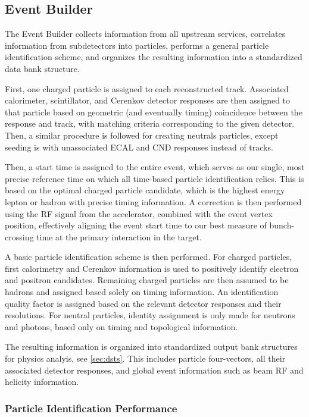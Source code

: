 
\subsection{Event Builder}
The Event Builder collects information from all upstream services, correlates information from subdetectors into particles, performs a general particle identification scheme, and organizes the resulting information into a standardized data bank structure.

First, one charged particle is assigned to each reconstructed track.  Associated calorimeter, scintillator, and C{e}renkov detector responses are then assigned to that particle based on geometric (and eventually timing) coincidence between the response and track, with matching criteria corresponding to the given detector.  Then, a similar procedure is followed for creating neutrals particles, except seeding is with unassociated ECAL and CND responses instead of tracks.

Then, a start time is assigned to the entire event, which serves as our single, most precise reference time on which all time-based particle identification relies.  This is based on the optimal charged particle candidate, which is the highest energy lepton or hadron with precise timing information.  A correction is then performed using the RF signal from the accelerator, combined with the event vertex position, effectively aligning the event start time to our best measure of bunch-crossing time at the primary interaction in the target.

A basic particle identification scheme is then performed.  For charged particles, first calorimetry and Cerenkov information is used to positively identify electron and positron candidates.  Remaining charged particles are then assumed to be hadrons and assigned based solely on timing information.  An identification quality factor is assigned based on the relevant detector responses and their resolutions.  For neutral particles, identity assignment is only made for neutrons and photons, based only on timing and topological information.

The resulting information is organized into standardized output bank structures for physics analyis, see \ref{sec:dsts}.  This includes particle four-vectors, all their associated detector responses, and global event information such as beam RF and helicity information.

\subsubsection{Particle Identification Performance}

